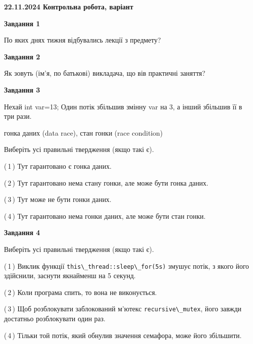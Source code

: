 \documentclass[12pt, ukrainian]{article}
\def\code#1{\Verb!#1!}
\begin{document}
\begin {large}

\textbf{22.11.2024 Контрольна робота, варіант  }\par


{

\begin{center}
\textbf{Завдання 1}
\end{center}

По яких днях тижня відбувались лекції з предмету?


\begin{center}
\textbf{Завдання 2}
\end{center}

Як зовуть (ім'я, по батькові) викладача, що вів практичні заняття?


\begin{center}
\textbf{Завдання 3}
\end{center}

Нехай int var=13; Один потік збільшив змінну var на 3, а інший збільшив її в три рази.

гонка даних (data race), стан гонки (race condition)

Виберіть усі правильні твердження (якщо такі є).\par
\vspace{2mm}
(\,1\,) Тут гарантовано є гонка даних.%

(\,2\,) Тут гарантовано нема стану гонки, але може бути гонка даних.%

(\,3\,) Тут може не бути гонки даних.%

(\,4\,) Тут гарантовано нема гонки даних, але може бути стан гонки.%


\begin{center}
\textbf{Завдання 4}
\end{center}

Виберіть усі правильні твердження (якщо такі є).\par
\vspace{2mm}

(\,1\,) Виклик функції \code{this\_thread::sleep\_for(5s)} змушує потік, з якого його здійснили, заснути якнайменш на 5 секунд.%

(\,2\,) Коли програма спить, то вона не виконується.%

(\,3\,) Щоб розблокувати заблокований м’ютекс \code{recursive\_mutex}, його завжди достатньо розблокувати один раз.%

(\,4\,) Тільки той потік, який обнулив значення семафора, може його збільшити.%


}
\end{large}
\end{document}
